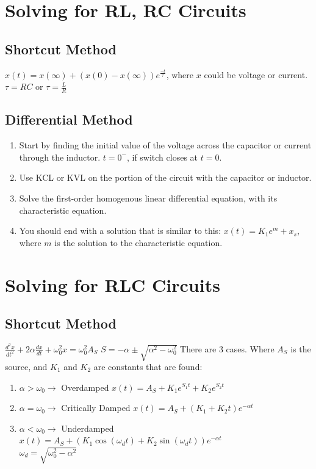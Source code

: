 \documentclass[10pt,letterpaper,final,twoside,notitlepage]{article}
\begin{document}
\section*{Solving for RL, RC Circuits}
	\subsection*{Shortcut Method}
		$x(t)=x(\infty )+(x(0)-x(\infty ))e^\frac{-t}{\tau}$, where $x$ could be voltage or current. \newline
		$\tau = RC$ or $\tau = \frac{L}{R}$
	\subsection*{Differential Method}
		\begin{enumerate}
			\item Start by finding the initial value of the voltage across the capacitor or current through the inductor. $t=0^-$, if switch closes at $t=0$.
			\item Use KCL or KVL on the portion of the circuit with the capacitor or inductor. 
			\item Solve the first-order homogenous linear differential equation, with its characteristic equation.
			\item You should end with a solution that is similar to this: $x(t)=K_1e^m + x_s$, where $m$ is the solution to the characteristic equation.
		\end{enumerate}
\section*{Solving for RLC Circuits}
	\subsection*{Shortcut Method}
		$\frac{d^2x}{dt^2}+2\alpha\frac{dx}{dt}+\omega_0^2x=\omega_0^2A_S$ \newline \newline
		$S = -\alpha \pm \sqrt{\alpha^2-\omega_0^2}$ \newline
		There are 3 cases. \newline
		Where $A_S$ is the source, and $K_1$ and $K_2$ are constants that are found:
		\begin{enumerate}
			\item $\alpha > \omega_0 \longrightarrow$ Overdamped \newline
				$x(t)=A_S+K_1e^{S_{1}t}+K_2e^{S_{2}t}$
			\item $\alpha = \omega_0 \longrightarrow$ Critically Damped \newline
				$x(t)=A_S+\left(K_1+K_2t\right)e^{-\alpha t}$
			\item $\alpha < \omega_0 \longrightarrow$ Underdamped \newline
				$x(t)=A_S+\left(K_1\cos(\omega_d t)+K_2\sin(\omega_d t)\right)e^{-\alpha t}$ \\
				$\omega_d=\sqrt{\omega_0^2-\alpha^2}$
		\end{enumerate}
\end{document}
